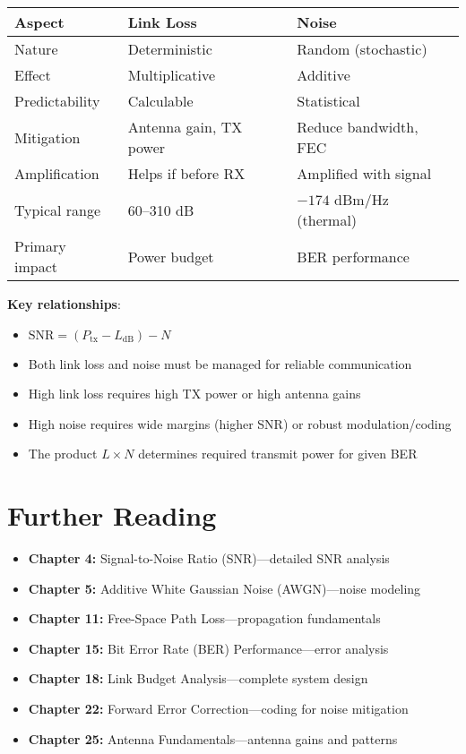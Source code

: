 \begin{center}
\begin{tabular}{@{}lll@{}}
\toprule
\textbf{Aspect} & \textbf{Link Loss} & \textbf{Noise} \\
\midrule
Nature & Deterministic & Random (stochastic) \\
Effect & Multiplicative & Additive \\
Predictability & Calculable & Statistical \\
Mitigation & Antenna gain, TX power & Reduce bandwidth, FEC \\
Amplification & Helps if before RX & Amplified with signal \\
Typical range & 60--310 dB & $-174$ dBm/Hz (thermal) \\
Primary impact & Power budget & BER performance \\
\bottomrule
\end{tabular}
\end{center}

\textbf{Key relationships}:
\begin{itemize}
\item $\text{SNR} = (P_{\text{tx}} - L_{\text{dB}}) - N$
\item Both link loss and noise must be managed for reliable communication
\item High link loss requires high TX power or high antenna gains
\item High noise requires wide margins (higher SNR) or robust modulation/coding
\item The product $L \times N$ determines required transmit power for given BER
\end{itemize}

\section{Further Reading}

\begin{itemize}
\item \textbf{Chapter 4:} Signal-to-Noise Ratio (SNR)---detailed SNR analysis
\item \textbf{Chapter 5:} Additive White Gaussian Noise (AWGN)---noise modeling
\item \textbf{Chapter 11:} Free-Space Path Loss---propagation fundamentals
\item \textbf{Chapter 15:} Bit Error Rate (BER) Performance---error analysis
\item \textbf{Chapter 18:} Link Budget Analysis---complete system design
\item \textbf{Chapter 22:} Forward Error Correction---coding for noise mitigation
\item \textbf{Chapter 25:} Antenna Fundamentals---antenna gains and patterns
\end{itemize}
